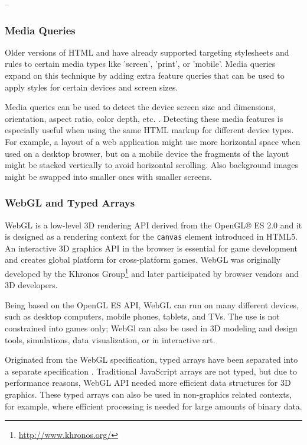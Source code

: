 --

\subsubsection{Media Queries}

Older versions of HTML and  have already supported targeting
stylesheets and rules to certain media types like 'screen', 'print',
or 'mobile'. Media queries expand on this technique by adding extra
feature queries that can be used to apply styles for certain devices
and screen sizes. \cite{mediaqueries}

Media queries can be used to detect the device screen size and
dimensions, orientation, aspect ratio, color depth,
etc. \cite{mediaqueries}. Detecting these media features is especially
useful when using the same HTML markup for different device types. For
example, a layout of a web application might use more horizontal space
when used on a desktop browser, but on a mobile device the fragments
of the layout might be stacked vertically to avoid horizontal
scrolling. Also background images might be swapped into smaller ones
with smaller screens.

\subsubsection{WebGL and Typed Arrays}

WebGL is a low-level 3D rendering API derived from the OpenGL® ES 2.0
\cite{OpenGL} and it is designed as a rendering context for the
\texttt{canvas} element introduced in HTML5. An interactive 3D
graphics API in the browser is essential for game development and
creates global platform for cross-platform games. WebGL was originally
developed by the Khronos Group\footnote{\url{http://www.khronos.org/}}
and later participated by browser vendors and 3D
developers. \cite{WebGL}

Being based on the OpenGL ES API, WebGL can run on many different
devices, such as desktop computers, mobile phones, tablets, and
TVs. The use is not constrained into games only; WebGl can also be
used in 3D modeling and design tools, simulations, data visualization,
or in interactive art.

Originated from the WebGL specification, typed arrays have been
separated into a separate specification
\cite{TypedArrays}. Traditional JavaScript arrays are not typed, but
due to performance reasons, WebGL API needed more efficient data
structures for 3D graphics. These typed arrays can also be used in
non-graphics related contexts, for example, where efficient processing
is needed for large amounts of binary data.

